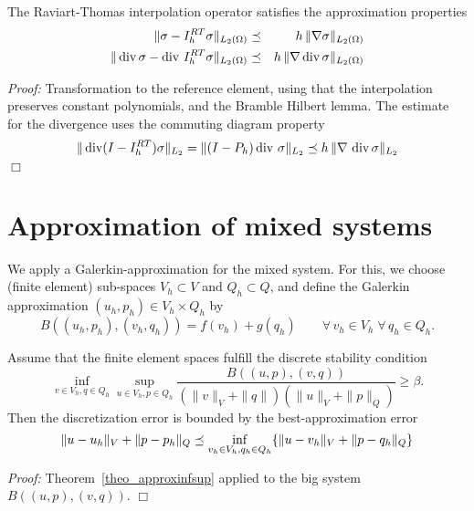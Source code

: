 \bigskip

\begin{theorem} The Raviart-Thomas interpolation operator satisfies
the approximation properties
\begin{eqnarray*}
\| \sigma - I_h^{RT} \sigma \|_{L_2(\Omega)} & \preceq &
         h \, \| \nabla \sigma \|_{L_2(\Omega)} \\
\| \operatorname{div} \sigma - \operatorname{div} \, I_h^{RT} \sigma \|_{L_2(\Omega)} & \preceq &
         h \, \| \nabla \operatorname{div} \sigma \|_{L_2(\Omega)} \\
\end{eqnarray*}
\end{theorem}
{\em Proof:} Transformation to the reference element, using that the 
interpolation preserves constant polynomials, and the Bramble Hilbert lemma.
The estimate for the divergence uses the commuting diagram property
$$
\| \operatorname{div} (I - I_h^{RT}) \sigma \|_{L_2} = \| (I-P_h) \operatorname{div} \, \sigma \|_{L_2}
\preceq h \, \| \nabla \, \operatorname{div} \sigma \|_{L_2}
$$
\hfill $\Box$
\section{Approximation of mixed systems}
We apply a Galerkin-approximation for the mixed system. For this,
we choose (finite element) sub-spaces $V_h \subset V$ and $Q_h \subset Q$, 
and define the Galerkin approximation $(u_h, p_h) \in V_h \times Q_h$ by
$$
B( (u_h, p_h), (v_h, q_h) ) = f(v_h) + g(q_h) \qquad \forall \, v_h \in V_h 
\; \forall \, q_h \in Q_h.
$$
\begin{theorem}
Assume that the finite element spaces fulfill the discrete stability
condition
\begin{equation}\label{equ_discreteinfsup}
\inf_{v \in V_h, q \in Q_h } \sup_{u \in V_h, p \in Q_h} \frac{B((u,p),(v,q))}{ ( \|v\|_V+\|q\|) (\|u\|_V+\|p\|_Q)} \geq \beta.
\end{equation}
Then the discretization error is bounded by the best-approximation error
$$
\| u - u_h \|_V + \| p - p_h \|_Q \preceq \inf_{v_h \in V_h, q_h \in Q_h}
        \{ \| u - v_h \|_V + \| p - q_h \|_Q \}
$$
\end{theorem}
{\em Proof:} Theorem~\ref{theo_approxinfsup} applied to the big system $B((u,p),(v,q))$. \hfill $\Box$

\bigskip


